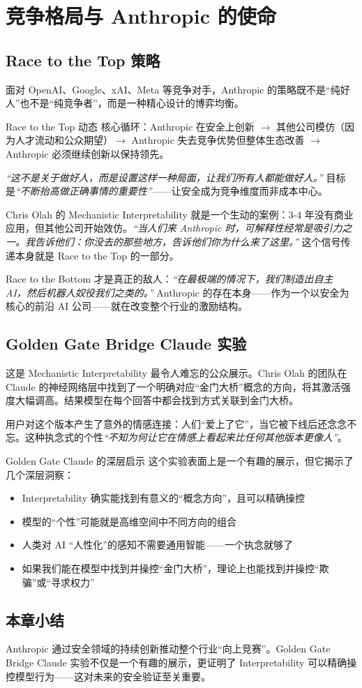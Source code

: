 \section{竞争格局与 Anthropic 的使命}

\subsection{Race to the Top 策略}

面对 OpenAI、Google、xAI、Meta 等竞争对手，Anthropic 的策略既不是``纯好人''也不是``纯竞争者''，而是一种精心设计的博弈均衡。

\begin{importantbox}{Race to the Top 动态}
核心循环：Anthropic 在安全上创新 $\to$ 其他公司模仿（因为人才流动和公众期望）$\to$ Anthropic 失去竞争优势但整体生态改善 $\to$ Anthropic 必须继续创新以保持领先。

\textit{``这不是关于做好人，而是设置这样一种局面，让我们所有人都能做好人。''} 目标是\textit{``不断抬高做正确事情的重要性''}——让安全成为竞争维度而非成本中心。

Chris Olah 的 Mechanistic Interpretability 就是一个生动的案例：3-4 年没有商业应用，但其他公司开始效仿。\textit{``当人们来 Anthropic 时，可解释性经常是吸引力之一。我告诉他们：你没去的那些地方，告诉他们你为什么来了这里。''} 这个信号传递本身就是 Race to the Top 的一部分。
\end{importantbox}

Race to the Bottom 才是真正的敌人：\textit{``在最极端的情况下，我们制造出自主 AI，然后机器人奴役我们之类的。''} Anthropic 的存在本身——作为一个以安全为核心的前沿 AI 公司——就在改变整个行业的激励结构。

\subsection{Golden Gate Bridge Claude 实验}

这是 Mechanistic Interpretability 最令人难忘的公众展示。Chris Olah 的团队在 Claude 的神经网络层中找到了一个明确对应``金门大桥''概念的方向，将其激活强度大幅调高。结果模型在每个回答中都会找到方式关联到金门大桥。

用户对这个版本产生了意外的情感连接：人们``爱上了它''，当它被下线后还念念不忘。这种执念式的个性\textit{``不知为何让它在情感上看起来比任何其他版本更像人''}。

\begin{knowledgebox}{Golden Gate Claude 的深层启示}
这个实验表面上是一个有趣的展示，但它揭示了几个深层洞察：
\begin{itemize}
    \item Interpretability 确实能找到有意义的``概念方向''，且可以精确操控
    \item 模型的``个性''可能就是高维空间中不同方向的组合
    \item 人类对 AI ``人性化''的感知不需要通用智能——一个执念就够了
    \item 如果我们能在模型中找到并操控``金门大桥''，理论上也能找到并操控``欺骗''或``寻求权力''
\end{itemize}
\end{knowledgebox}

\subsection{本章小结}

Anthropic 通过安全领域的持续创新推动整个行业``向上竞赛''。Golden Gate Bridge Claude 实验不仅是一个有趣的展示，更证明了 Interpretability 可以精确操控模型行为——这对未来的安全验证至关重要。


